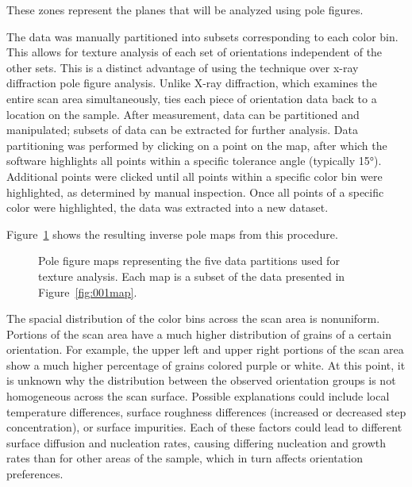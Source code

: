 \documentclass[12pt,%
              twoside,
               letterpaper]{uiothesis}
\begin{document}
%	
%
%		
%
%		
%		
%		
%		
%		
These zones represent the planes that will be analyzed using pole figures.

The data was manually partitioned into subsets corresponding to  each color bin. This
allows for texture analysis of each set of orientations independent of the other sets.
This is a distinct advantage of using the  technique over x-ray diffraction pole
figure analysis. Unlike X-ray diffraction, which examines the entire scan area
simultaneously,   ties each piece of orientation data back to a location on the
sample. After measurement, data can be partitioned and manipulated; subsets of data can be
extracted for further analysis. Data partitioning was performed by clicking on a point on
the map, after which the software highlights all points within a specific tolerance angle
(typically 15\si{\degree}). Additional points were clicked until all points within a
specific color bin were highlighted, as determined by manual inspection. Once all points
of a specific color were highlighted, the data was extracted into a new dataset. 

Figure~\ref{fig:partitionmaps} shows the resulting inverse pole maps from this procedure. 
\begin{figure}
	\caption[ figure maps for five data partitions]{%
		Pole figure maps representing the five data partitions 
		used for texture analysis. Each map is a subset of the 
		data presented in Figure~\ref{fig:001map}.}
	\label{fig:partitionmaps}
\end{figure}
The spacial distribution of the color bins across the scan area is nonuniform. Portions of
the scan area have a much higher distribution of grains of a certain orientation. For
example, the upper left and upper right portions of the scan area show a much higher
percentage of grains colored purple or white. At this point, it is unknown why the
distribution between the observed orientation groups is not homogeneous across the scan
surface. Possible explanations could include local temperature differences, surface
roughness differences (increased or decreased step concentration), or surface impurities.
Each of these factors could lead to different surface diffusion and nucleation rates,
causing differing nucleation and growth rates than for other areas of the sample, which in
turn affects orientation preferences.
\end{document}
